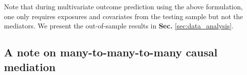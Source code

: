 \documentclass[
  12pt]{article}
\def\M{\mathbf{m}}
\def\X{\mathbf{x}}
\def\Y{\mathbf{y}}
\begin{document}
Note that during multivariate outcome prediction using the above formulation, one only requires exposures and covariates from the testing sample but not the mediators. We present the out-of-sample results in \textbf{Sec.} \ref{sec:data_analysis}.


\subsection{A note on many-to-many-to-many causal mediation}
\label{sec:causal.mediation.model}

\end{document}

